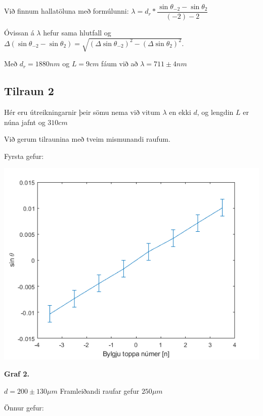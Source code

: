 \documentclass[12pt]{article}
\begin{document}
Við finnum hallatöluna með formúlunni:
$\lambda = d_r*\dfrac{\sin{\theta_{-2}}-\sin{\theta_{2}}}{(-2)-2} $

Óvissan á $\lambda$ hefur sama hlutfall og 
$\Delta (\sin{\theta_{-2}}-\sin{\theta_{2}})=\sqrt{(\Delta \sin{\theta_{-2}})^2-(\Delta \sin{\theta_{2}})^2}$.

Með $d_r=1880nm$ og $L = 9cm$ fáum við að $\lambda=711 \pm 4 nm$

\subsection{Tilraun 2}

Hér eru útreikningarnir þeir sömu nema við vitum $\lambda$ en ekki $d$, og lengdin $L$ er núna jafnt og $310 cm$

Við gerum tilraunina með tveim mismunandi raufum.

Fyrsta gefur:

\begin{center}
    \includegraphics[scale=0.5]{html/data_02.png}

    \bf Graf 2.
\end{center}

$d = 200 \pm 130 \mu m$
Framleiðandi raufar gefur $250 \mu m$

Önnur gefur:
\end{document}
